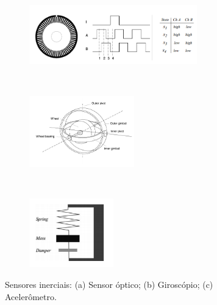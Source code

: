 \begin{figure}[h]
    \centering
    \captionsetup{width=0.8\textwidth,font=footnotesize,textfont=bf}
    \begin{subfigure}[b]{0.8\textwidth}
	\centering
        \includegraphics[width=0.8\textwidth,height=0.6\textheight,keepaspectratio]{figuras/optical.png}
        \caption{\centering \label{fig:optical}}
    \end{subfigure}
    ~
    \begin{subfigure}[b]{0.8\textwidth}
	\centering
        \includegraphics[width=0.5\textwidth,height=0.5\textheight,keepaspectratio]{figuras/giro.png}
        \caption{\centering \label{fig:giro}}
    \end{subfigure}
    ~
    \begin{subfigure}[b]{0.8\textwidth}
	\centering
        \includegraphics[width=0.4\textwidth,height=0.4\textheight,keepaspectratio]{figuras/acel.png}
        \caption{\centering \label{fig:acel}}
    \end{subfigure}
    \caption{\label{fig:Malhas} Sensores inerciais: (a) Sensor óptico; (b) Giroscópio; (c) Acelerômetro.}
    \caption*{\cite{controle}}
\end{figure}




